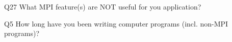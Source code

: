\begin{description}%
\item{Q27} What MPI feature(s) are NOT useful for you application?%
\item{Q5} How long have you been writing computer programs (incl. non-MPI programs)?%
\end{description}%
